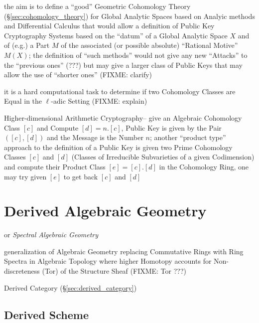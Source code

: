 the aim is to define a ``good'' Geometric Cohomology Theory
(\S\ref{sec:cohomology_theory}) for Global Analytic Spaces based on Analyic
methods and Differential Calculus that would allow a definition of Public Key
Cryptography Systems based on the ``datum'' of a Global Analytic Space $X$ and
of (e.g.) a Part $M$ of the associated (or possible absolute) ``Rational
Motive'' $M(X)$; the definition of ``such methods'' would not give any new
``Attacks'' to the ``previous ones'' (???) but may give a larger class of
Public Keys that may allow the use of ``shorter ones''
(FIXME: clarify)

it is a hard computational task to determine if two Cohomology Classes are
Equal in the $\ell$-adic Setting (FIXME: explain)

Higher-dimensional Arithmetic Cryptography-- give an Algebraic Cohomology Class
$[c]$ and Compute $[d] = n.[c]$, Public Key is given by the Pair $([c],[d])$
and the Message is the Number $n$; another ``product type'' approach to the
definition of a Public Key is given two Prime Cohomology Classes $[c]$ and
$[d]$ (Classes of Irreducible Subvarieties of a given Codimension) and compute
their Product Class $[e] = [c].[d]$ in the Cohomology Ring, one may try given
$[e]$ to get back $[c]$ and $[d]$



\section{Derived Algebraic Geometry}\label{sec:intersection_theory}

or \emph{Spectral Algebraic Geometry}

generalization of Algebraic Geometry replacing Commutative Rings with Ring
Spectra in Algebraic Topology where higher Homotopy accounts for
Non-discreteness (Tor) of the Structure Sheaf
(FIXME: Tor ???)

Derived Category (\S\ref{sec:derived_category})



\subsection{Derived Scheme}\label{sec:derived_scheme}

